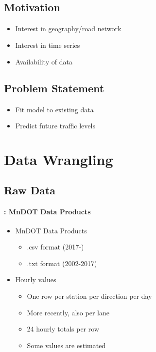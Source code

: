 \subsection{Motivation}
\begin{frame}{\insertsectionhead}
  \framesubtitle{\insertsubsectionhead}
	\begin{itemize}
		\item<+-> Interest in geography/road network
		\item<+-> Interest in time series
		\item<+-> Availability of data
	\end{itemize}
\end{frame}

\subsection{Problem Statement}
\begin{frame}{\insertsectionhead}
  \framesubtitle{\insertsubsectionhead}
	\begin{itemize}
		\item<+-> Fit model to existing data
		\item<+-> Predict future traffic levels
	\end{itemize}
\end{frame}

\section{Data Wrangling}

\subsection{Raw Data}

\begin{frame}{\insertsectionhead}
	\framesubtitle{\insertsubsectionhead: MnDOT Data Products}
	\begin{itemize}
		\item<+-> MnDOT Data Products
		\begin{itemize}
			\item<+-> .csv format (2017-)
			\item<+-> .txt format (2002-2017)
		\end{itemize}
		\item<+-> Hourly values
		\begin{itemize}
			\item<+-> One row per station per direction per day
			\item<+-> More recently, also per lane
			\item<+-> 24 hourly totals per row
			\item<+-> Some values are estimated
		\end{itemize}
	\end{itemize}
\end{frame}

